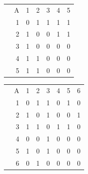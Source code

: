 \documentclass{article}
\begin{document}
\begin{enumerate}[label=(\alph*)]
\begin{minipage}[b]{0.4\textwidth}
    \begin{tabular}{l r|l l l l l}                      
		& \multicolumn{1}{r|}{A} &1   &2   &3   &4   &5   \\ \cline{2-7}
		& \multicolumn{1}{r|}{1} &0   &1   &1   &1   &1   \\
		& \multicolumn{1}{r|}{2} &1   &0   &0   &1   &1   \\ 
		& \multicolumn{1}{r|}{3} &1   &0   &0   &0   &0   \\
		& \multicolumn{1}{r|}{4} &1   &1   &0   &0   &0   \\ 
		& \multicolumn{1}{r|}{5} &1   &1   &0   &0   &0   \\ 
	\end{tabular}
\end{minipage}
\hfill
\begin{minipage}[b]{0.4\textwidth}
    \begin{tabular}{l r|l l l l l l}                      
		& \multicolumn{1}{r|}{A} &1   &2   &3   &4   &5  &6 \\ \cline{2-8}
		& \multicolumn{1}{r|}{1} &0   &1   &1   &0   &1  &0\\
		& \multicolumn{1}{r|}{2} &1   &0   &1   &0   &0  &1\\ 
		& \multicolumn{1}{r|}{3} &1   &1   &0   &1   &1  &0\\
		& \multicolumn{1}{r|}{4} &0   &0   &1   &0   &0  &0\\ 
		& \multicolumn{1}{r|}{5} &1   &0   &1   &0   &0  &0\\ 
		& \multicolumn{1}{r|}{6} &0   &1   &0   &0   &0  &0\\ 
	\end{tabular}
\end{minipage}
\end{enumerate}
\end{document}
